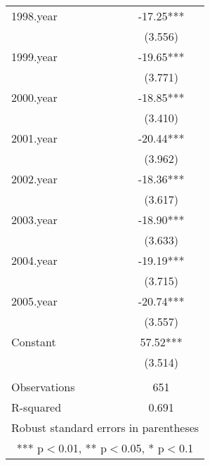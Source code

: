 \begin{tabular}{lc}
1998.year & -17.25*** \\
 & (3.556) \\
1999.year & -19.65*** \\
 & (3.771) \\
2000.year & -18.85*** \\
 & (3.410) \\
2001.year & -20.44*** \\
 & (3.962) \\
2002.year & -18.36*** \\
 & (3.617) \\
2003.year & -18.90*** \\
 & (3.633) \\
2004.year & -19.19*** \\
 & (3.715) \\
2005.year & -20.74*** \\
 & (3.557) \\
Constant & 57.52*** \\
 & (3.514) \\
 &  \\
Observations & 651 \\
 R-squared & 0.691 \\ \hline
\multicolumn{2}{c}{ Robust standard errors in parentheses} \\
\multicolumn{2}{c}{ *** p$<$0.01, ** p$<$0.05, * p$<$0.1} \\
\end{tabular}
